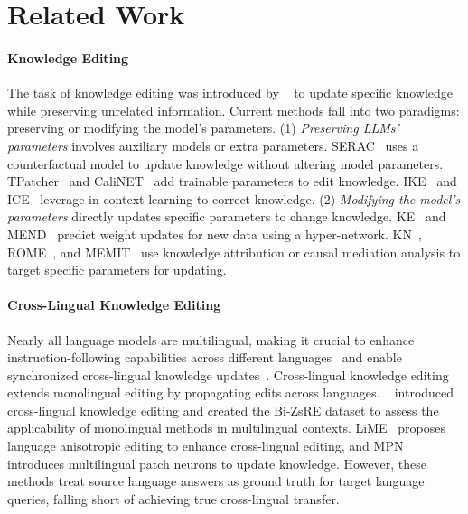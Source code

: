 \section{Related Work}
\paragraph{Knowledge Editing}  
The task of knowledge editing was introduced by ~\cite{sinitsin2020editable} to update specific knowledge while preserving unrelated information. Current methods fall into two paradigms: preserving or modifying the model’s parameters.
(1) \emph{Preserving LLMs' parameters} involves auxiliary models or extra parameters. SERAC~\cite{mitchell2022memory} uses a counterfactual model to update knowledge without altering model parameters. TPatcher~\cite{huang2023transformer} and CaliNET~\cite{dong2022calibrating} add trainable parameters to edit knowledge. IKE~\cite{zheng2023can} and ICE~\cite{cohen2024evaluating} leverage in-context learning to correct knowledge.
(2) \emph{Modifying the model's parameters} directly updates specific parameters to change knowledge. KE~\cite{de2021editing} and MEND~\cite{mitchell2021fast} predict weight updates for new data using a hyper-network. KN~\cite{dai2021knowledge}, ROME~\cite{meng2022rome}, and MEMIT~\cite{meng2022mass} use knowledge attribution or causal mediation analysis to target specific parameters for updating.

\paragraph{Cross-Lingual Knowledge Editing}  
Nearly all language models are multilingual, making it crucial to enhance instruction-following capabilities across different languages~\cite{zan2024building} and enable synchronized cross-lingual knowledge updates~\cite{xu2022language,wang2023cross}. 
Cross-lingual knowledge editing extends monolingual editing by propagating edits across languages. ~\citet{wang2023cross} introduced cross-lingual knowledge editing and created the Bi-ZsRE dataset to assess the applicability of monolingual methods in multilingual contexts. LiME~\cite{xu2022language} proposes language anisotropic editing to enhance cross-lingual editing, and MPN~\cite{si2024mpn} introduces multilingual patch neurons to update knowledge. However, these methods treat source language answers as ground truth for target language queries, falling short of achieving true cross-lingual transfer.

